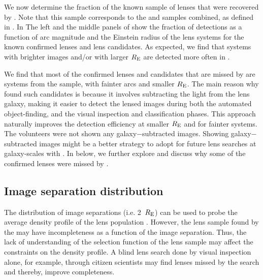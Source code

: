 \documentclass[useAMS,usenatbib,a4paper]{mn2e}
\begin{document}
We now determine the fraction of the known sample of lenses that were
recovered by \sw. Note that this sample corresponds to the \rf and \af
samples combined, as defined in . In
 The left and the middle panels of  show the
fraction of detections as a function of arc magnitude and the Einstein
radius of the lens systems for the known confirmed lenses and lens
candidates. As expected, we find that systems with brighter images
and/or with larger $R_{\rm E}$ are detected more often in \sw.

We find that most of the confirmed lenses and candidates that are missed
by \sw are systems from the \rf sample, with fainter arcs and smaller $R_{\rm E}$.
The main reason why \rf found such candidates
is because it involves subtracting the light from the lens galaxy,
making it easier to detect the lensed images during both the automated
object-finding, and the visual inspection and classification
phases. This approach naturally improves the detection
efficiency at smaller $R_{\rm E}$ and for fainter systems. The \sw
volunteers were not shown any galaxy$-$subtracted images. Showing
galaxy$-$subtracted images might be a better strategy to adopt for future
lens searches at galaxy-scales with \sw. In
 below, we further explore and discuss why some of the confirmed
lenses were missed by \sw.



\subsection{Image separation distribution}
\label{sec:results:isd}

The distribution of image separations (i.e. 2~$R_{\rm E}$)
can be used to probe the average density profile of the lens population
\citep{Oguri2006,More2012}.  However, the lens sample found by the \af
may have incompleteness as a function of the image separation. Thus, the
lack of understanding of the selection function of the lens sample may
affect the constraints on the density profile. A blind lens search done
by visual inspection alone, for example, through \sw citizen scientists may find
lenses missed by the \af search and thereby, improve completeness.
\end{document}
